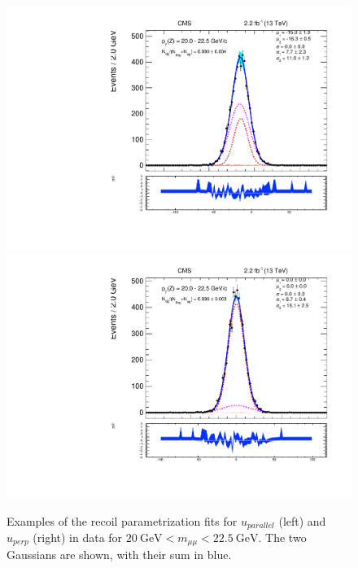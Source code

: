\begin{figure}
\centering
\includegraphics[width=0.49\linewidth]{plots/Recoil/example-data-pfu1fit_12.pdf}
\includegraphics[width=0.49\linewidth]{plots/Recoil/example-data-pfu2fit_12.pdf}
\caption{Examples of the recoil parametrization fits for $u_{parallel}$ (left) and $u_{perp}$ (right) in data for $20~\mathrm{GeV} < m_{\mu\mu}  < 22.5~\mathrm{GeV}$. The two Gaussians are shown, with their sum in blue.}
\label{fig:recoil:data_fit_example}
\end{figure}